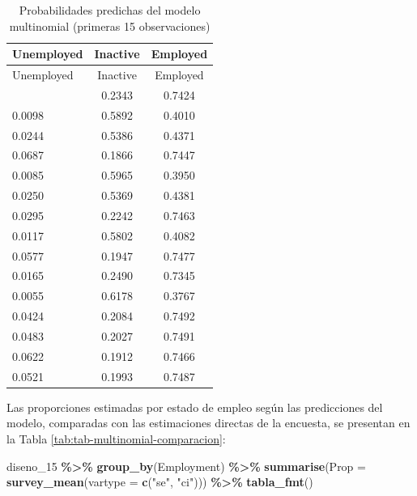 \documentclass[
  spanish,
  12pt,
]{book}
\newenvironment{Shaded}{\begin{snugshade}}{\end{snugshade}}
\newcommand{\AttributeTok}[1]{\textcolor[rgb]{0.13,0.29,0.53}{#1}}
\newcommand{\FunctionTok}[1]{\textcolor[rgb]{0.13,0.29,0.53}{\textbf{#1}}}
\newcommand{\NormalTok}[1]{#1}
\newcommand{\SpecialCharTok}[1]{\textcolor[rgb]{0.81,0.36,0.00}{\textbf{#1}}}
\newcommand{\StringTok}[1]{\textcolor[rgb]{0.31,0.60,0.02}{#1}}
\begin{document}
\begin{longtable}[]{@{}lcc@{}}
\caption{\label{tab:tab-multinomial-predicciones}Probabilidades predichas del modelo multinomial (primeras 15 observaciones)}\tabularnewline
\toprule\noalign{}
Unemployed & Inactive & Employed \\
\midrule\noalign{}
\endfirsthead
\toprule\noalign{}
Unemployed & Inactive & Employed \\
\midrule\noalign{}
\endhead
\bottomrule\noalign{}
\endlastfoot
0.0233 & 0.2343 & 0.7424 \\
0.0098 & 0.5892 & 0.4010 \\
0.0244 & 0.5386 & 0.4371 \\
0.0687 & 0.1866 & 0.7447 \\
0.0085 & 0.5965 & 0.3950 \\
0.0250 & 0.5369 & 0.4381 \\
0.0295 & 0.2242 & 0.7463 \\
0.0117 & 0.5802 & 0.4082 \\
0.0577 & 0.1947 & 0.7477 \\
0.0165 & 0.2490 & 0.7345 \\
0.0055 & 0.6178 & 0.3767 \\
0.0424 & 0.2084 & 0.7492 \\
0.0483 & 0.2027 & 0.7491 \\
0.0622 & 0.1912 & 0.7466 \\
0.0521 & 0.1993 & 0.7487 \\
\end{longtable}

Las proporciones estimadas por estado de empleo según las predicciones del modelo, comparadas con las estimaciones directas de la encuesta, se presentan en la Tabla \ref{tab:tab-multinomial-comparacion}:

\begin{Shaded}
\end{Shaded}

\begin{Shaded}
\begin{Highlighting}[]
\NormalTok{diseno\_15 }\SpecialCharTok{\%\textgreater{}\%}
  \FunctionTok{group\_by}\NormalTok{(Employment) }\SpecialCharTok{\%\textgreater{}\%}
  \FunctionTok{summarise}\NormalTok{(}\AttributeTok{Prop =} \FunctionTok{survey\_mean}\NormalTok{(}\AttributeTok{vartype =} \FunctionTok{c}\NormalTok{(}\StringTok{"se"}\NormalTok{, }\StringTok{"ci"}\NormalTok{))) }\SpecialCharTok{\%\textgreater{}\%}
  \FunctionTok{tabla\_fmt}\NormalTok{()}
\end{Highlighting}
\end{Shaded}
\end{document}
